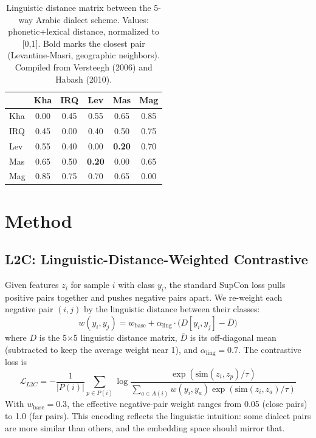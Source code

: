 \documentclass[11pt,a4paper,twocolumn]{article}
\newcommand{\method}{L2C}
\begin{document}
\begin{table}[t]
\centering
\small
\begin{tabular}{lccccc}
\toprule
& Kha & IRQ & Lev & Mas & Mag \\
\midrule
Kha & 0.00 & 0.45 & 0.55 & 0.65 & 0.85 \\
IRQ & 0.45 & 0.00 & 0.40 & 0.50 & 0.75 \\
Lev & 0.55 & 0.40 & 0.00 & \textbf{0.20} & 0.70 \\
Mas & 0.65 & 0.50 & \textbf{0.20} & 0.00 & 0.65 \\
Mag & 0.85 & 0.75 & 0.70 & 0.65 & 0.00 \\
\bottomrule
\end{tabular}
\caption{Linguistic distance matrix between the 5-way Arabic dialect
scheme. Values: phonetic+lexical distance, normalized to [0,1]. Bold
marks the closest pair (Levantine-Masri, geographic neighbors).
Compiled from Versteegh (2006) and Habash (2010).}
\label{tab:dist}
\end{table}

\section{Method}
\label{sec:method}

\subsection{\method{}: Linguistic-Distance-Weighted Contrastive}
Given features $z_i$ for sample $i$ with class $y_i$, the standard
SupCon loss pulls positive pairs together and pushes negative pairs
apart. We re-weight each negative pair $(i,j)$ by the linguistic
distance between their classes:
\begin{equation}
w(y_i,y_j) = w_{\text{base}} + \alpha_{\text{ling}} \cdot \bigl(D[y_i,y_j] - \bar{D}\bigr)
\label{eq:l2c}
\end{equation}
where $D$ is the 5$\times$5 linguistic distance matrix,
$\bar{D}$ is its off-diagonal mean (subtracted to keep the average
weight near 1), and $\alpha_{\text{ling}}=0.7$. The contrastive loss is
\begin{equation}
\mathcal{L}_{\method{}} = -\frac{1}{|P(i)|}\sum_{p\in P(i)}
\log\frac{\exp(\mathrm{sim}(z_i,z_p)/\tau)}
{\sum_{a\in A(i)} w(y_i,y_a)\exp(\mathrm{sim}(z_i,z_a)/\tau)}
\label{eq:l2c_full}
\end{equation}
With $w_{\text{base}}=0.3$, the effective negative-pair weight ranges
from 0.05 (close pairs) to 1.0 (far pairs). This encoding reflects
the linguistic intuition: some dialect pairs are more similar than
others, and the embedding space should mirror that.
\end{document}
